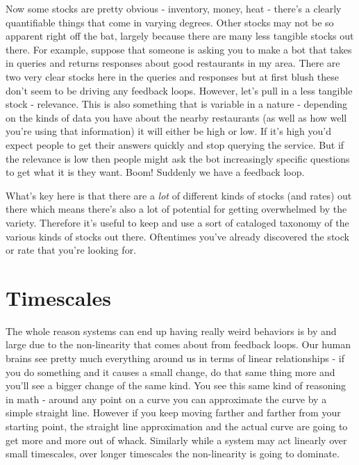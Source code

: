 \documentclass[11pt,a5paper]{book}
\begin{document}
Now some stocks are pretty obvious - inventory, money, heat - there's a clearly quantifiable things that come in varying degrees. Other stocks may not be so apparent right off the bat, largely because there are many less tangible stocks out there. For example, suppose that someone is asking you to make a bot that takes in queries and returns responses  about good restaurants in my area. There are two very clear stocks here in the queries and responses but at first blush these don't seem to be driving any feedback loops. However, let's pull in a less tangible stock - relevance. This is also something that is variable in a nature - depending on the kinds of data you have about the nearby restaurants (as well as how well you're using that information) it will either be high or low. If it's high you'd expect people to get their answers quickly and stop querying the service. But if the relevance is low then people might ask the bot increasingly specific questions to get what it is they want. Boom! Suddenly we have a feedback loop. 
\newline

What's key here is that there are a \textit{lot} of different kinds of stocks (and rates) out there which means there's also a lot of potential for getting overwhelmed by the variety. Therefore it's useful to keep and use a sort of cataloged taxonomy of the various kinds of stocks out there. Oftentimes you've already discovered the stock or rate that you're looking for. 

\section{Timescales}
The whole reason systems can end up having really weird behaviors is by and large due to the non-linearity that comes about from feedback loops. Our human brains see pretty much everything around us in terms of linear relationships - if you do something and it causes a small change, do that same thing more and you'll see a bigger change of the same kind. You see this same kind of reasoning in math - around any point on a curve you can approximate the curve by a simple straight line. However if you keep moving farther and farther from your starting point, the straight line approximation and the actual curve are going to get more and more out of whack. Similarly while a system may act linearly over small timescales, over longer timescales the non-linearity is going to dominate.
\newline
\end{document}
